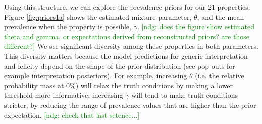 \documentclass[10pt,letterpaper]{article}
\newcommand{\ndg}[1]{\textcolor{Green}{[ndg: #1]}}
\begin{document}

Using this structure, we can explore the prevalence priors for our 21 properties:
Figure \ref{fig:priors1a} shows the estimated mixture-parameter, $\theta$, and the mean prevalence when the property is possible, $\gamma$. \ndg{does the figure show estimated theta and gamma, or expectations derived from reconstructed priors? are those different?}
We see significant diversity among these properties in both parameters. This diversity matters because the model predictions for generic interpretation and felicity depend on the shape of the prior distribution (see pop-outs for example interpretation posteriors).
For example, increasing $\theta$ (i.e. the relative probability mass at 0\%) will relax the truth conditions by making a lower threshold more informative; increasing $\gamma$ will tend to make truth conditions stricter, by reducing the range of prevalence values that are higher than the prior expectation. \ndg{check that last setence...}
 



\end{document}
